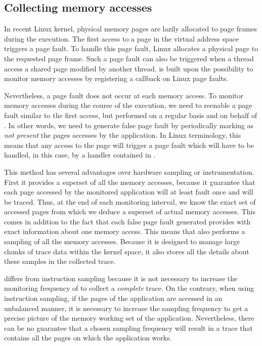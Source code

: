 \subsection{Collecting memory accesses}

In recent Linux kernel, physical memory pages are lazily allocated to page frames during
the execution. The first access to a page in the virtual address space triggers a page fault.
To handle this page fault, Linux allocates a physical page to the requested page frame.
Such a page fault can also be triggered when a thread access a shared page modified by
another thread. \Moca is built upon the possibility to monitor memory accesses by registering
a callback on Linux page faults.

Nevertheless, a page fault does not occur at each memory access. To monitor memory accesses during
the course of the execution, we need to reenable a page fault similar to the first access, but
performed on a regular basis and on behalf of \Moca.
In other words, we need to generate false page fault by periodically marking as \emph{not present}
the pages accesses by the application.
In Linux terminology, this means that any access to the page will trigger a page fault which
will have to be handled, in this case, by a handler contained in \Moca.

This method has several advantages over hardware sampling or
instrumentation. First it provides a superset of all the memory accesses, because it
guarantee that each page accessed by the monitored application will at least fault once
and will be traced. Thus, at the end of each monitoring interval, we know the exact set
of accessed pages from which we deduce a superset of actual memory accesses.
This comes in addition to the fact that each false page fault generated provides \Moca with
exact information about one memory access. This means that \Moca also performs a sampling
of all the memory accesses. Because it is designed to manage large chunks of trace data
within the kernel space, it also stores all the details about these samples in the collected trace.

\Moca differs from instruction sampling because it is not necessary to increase the monitoring
frequency of \Moca to collect a \emph{complete} trace. On the contrary, when using instruction sampling,
if the pages of the application are accessed in an unbalanced manner, it is necessary to increase
the sampling frequency to get a precise picture of the memory working set of the application.
Nevertheless, there can be no guarantee that a chosen sampling frequency will result in a trace
that contains all the pages on which the application works.

